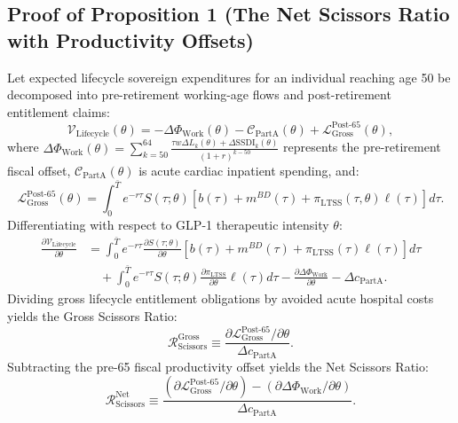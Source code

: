 \documentclass[11pt,a4paper]{article}
\begin{document}
\subsection{Proof of Proposition 1 (The Net Scissors Ratio with Productivity Offsets)}
\label{app:prop_proof}
Let expected lifecycle sovereign expenditures for an individual reaching age 50 be decomposed into pre-retirement working-age flows and post-retirement entitlement claims:
\begin{equation}
    \mathcal{V}_{\text{Lifecycle}}(\theta) = -\Delta\Phi_{\text{Work}}(\theta) - \mathcal{C}_{\text{PartA}}(\theta) + \mathcal{L}_{\text{Gross}}^{\text{Post-65}}(\theta),
\end{equation}
where $\Delta\Phi_{\text{Work}}(\theta) = \sum_{k=50}^{64} \frac{\tau w \Delta L_k(\theta) + \Delta \text{SSDI}_k(\theta)}{(1+r)^{k-50}}$ represents the pre-retirement fiscal offset, $\mathcal{C}_{\text{PartA}}(\theta)$ is acute cardiac inpatient spending, and:
\begin{equation}
    \mathcal{L}_{\text{Gross}}^{\text{Post-65}}(\theta) = \int_0^{\bar{T}} e^{-r \tau} S(\tau; \theta) \left[ b(\tau) + m^{BD}(\tau) + \pi_{\text{LTSS}}(\tau, \theta)\ell(\tau) \right] d\tau.
\end{equation}
Differentiating with respect to GLP-1 therapeutic intensity $\theta$:
\begin{equation}
\begin{aligned}
    \frac{\partial \mathcal{V}_{\text{Lifecycle}}}{\partial \theta} &= \int_0^{\bar{T}} e^{-r \tau} \frac{\partial S(\tau; \theta)}{\partial \theta} \left[ b(\tau) + m^{BD}(\tau) + \pi_{\text{LTSS}}(\tau)\ell(\tau) \right] d\tau \\
    &\quad + \int_0^{\bar{T}} e^{-r \tau} S(\tau; \theta) \frac{\partial \pi_{\text{LTSS}}}{\partial \theta}\ell(\tau) d\tau - \frac{\partial \Delta\Phi_{\text{Work}}}{\partial \theta} - \Delta c_{\text{PartA}}.
\end{aligned}
\end{equation}
Dividing gross lifecycle entitlement obligations by avoided acute hospital costs yields the Gross Scissors Ratio:
\begin{equation}
    \mathcal{R}_{\text{Scissors}}^{\text{Gross}} \equiv \frac{\partial \mathcal{L}_{\text{Gross}}^{\text{Post-65}} / \partial \theta}{\Delta c_{\text{PartA}}}.
\end{equation}
Subtracting the pre-65 fiscal productivity offset yields the Net Scissors Ratio:
\begin{equation}
    \mathcal{R}_{\text{Scissors}}^{\text{Net}} \equiv \frac{\left( \partial \mathcal{L}_{\text{Gross}}^{\text{Post-65}} / \partial \theta \right) - \left( \partial \Delta\Phi_{\text{Work}} / \partial \theta \right)}{\Delta c_{\text{PartA}}}.
\end{equation}
\end{document}
